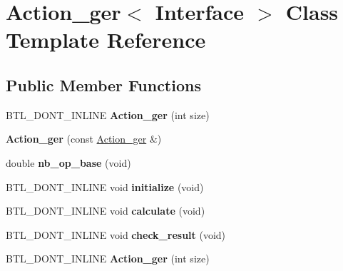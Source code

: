 \hypertarget{class_action__ger}{}\section{Action\+\_\+ger$<$ Interface $>$ Class Template Reference}
\label{class_action__ger}
\subsection*{Public Member Functions}
\begin{DoxyCompactItemize}
\item 
\mbox{\label{class_action__ger_a5e4baf1dd3cf3f776fa63461b8f7b168}} 
B\+T\+L\+\_\+\+D\+O\+N\+T\+\_\+\+I\+N\+L\+I\+NE {\bfseries Action\+\_\+ger} (int size)
\item 
\mbox{\label{class_action__ger_a1b96aa38a280c79a9165f10b7bd22470}} 
{\bfseries Action\+\_\+ger} (const \hyperlink{class_action__ger}{Action\+\_\+ger} \&)
\item 
\mbox{\label{class_action__ger_ad351bc01c2ef5eb1e4f37c44ecc5e4ae}} 
double {\bfseries nb\+\_\+op\+\_\+base} (void)
\item 
\mbox{\label{class_action__ger_a02cbbf9d4b4717aaaae0742319dedcf4}} 
B\+T\+L\+\_\+\+D\+O\+N\+T\+\_\+\+I\+N\+L\+I\+NE void {\bfseries initialize} (void)
\item 
\mbox{\label{class_action__ger_a5353c98d7cd5cb72b56eb3fe9b6e1e42}} 
B\+T\+L\+\_\+\+D\+O\+N\+T\+\_\+\+I\+N\+L\+I\+NE void {\bfseries calculate} (void)
\item 
\mbox{\label{class_action__ger_a52e73e2092e37993abcdc50fd2e99444}} 
B\+T\+L\+\_\+\+D\+O\+N\+T\+\_\+\+I\+N\+L\+I\+NE void {\bfseries check\+\_\+result} (void)
\item 
\mbox{\label{class_action__ger_a5e4baf1dd3cf3f776fa63461b8f7b168}} 
B\+T\+L\+\_\+\+D\+O\+N\+T\+\_\+\+I\+N\+L\+I\+NE {\bfseries Action\+\_\+ger} (int size)
\item 
\mbox{\label{class_action__ger_a1b96aa38a280c79a9165f10b7bd22470}} 

\end{DoxyCompactItemize}
